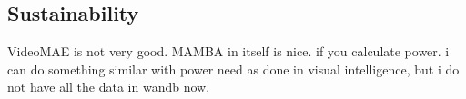 \subsection{Sustainability}
VideoMAE is not very good. MAMBA in itself is nice. if you calculate power. i can do something similar with power need as done in visual intelligence, but i do not have all the data in wandb now. 